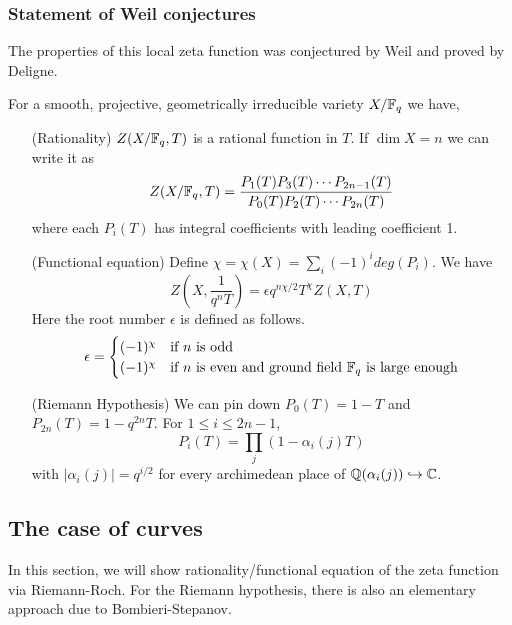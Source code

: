 \documentclass[letterpaper,11pt]{article}
\begin{document}
\subsubsection{Statement of Weil conjectures}
The properties of this local zeta function was conjectured by Weil and proved by Deligne.
\begin{thm}[Deligne]
For a smooth, projective, geometrically irreducible variety $X/\mathbb{F}_q$ we have,
\begin{itemize}
    \item[(Rationality)] $Z(X/\mathbb{F}_q, T)$ is a rational function in $T$. If $\dim X = n$ we can write it as 
    \[
    Z(X/\mathbb{F}_q,T) = \frac{P_1(T)P_3(T)\cdots P_{2n-1}(T)}{P_0(T)P_2(T) \cdots P_{2n}(T)}
    \]
    where each $P_i(T)$ has integral coefficients with leading coefficient 1.
    \item[(Functional equation)] Define $\chi = \chi(X) = \sum_i (-1)^i deg(P_i)$. We have
    \[
    Z\left(X, \frac{1}{q^n T}\right) = \epsilon q^{n \chi /2} T^{\chi} Z(X,T)
    \]
    Here the root number $\epsilon$ is defined as follows.
    \[
    \epsilon = \begin{cases}(-1)^{\chi} & \text{if $n$ is odd} \\ (-1)^{\chi} & \text{if $n$ is even and ground field $\mathbb{F}_q$ is large enough}\end{cases}
    \]
    \item[(Riemann Hypothesis)] We can pin down $P_0(T) = 1-T$ and $P_{2n}(T) = 1-q^{2n}T$. For $1 \leq i \leq 2n-1$, 
    \[
    P_i(T) = \prod_j (1 - \alpha_i(j) T)
    \]
    with $|\alpha_i(j)| = q^{i/2}$ for every archimedean place of $\mathbb{Q}(\alpha_i(j)) \hookrightarrow \mathbb{C}$.
\end{itemize}
\end{thm}
\subsection{The case of curves}
In this section, we will show rationality/functional equation of the zeta function via Riemann-Roch. For the Riemann hypothesis, there is also an elementary approach due to Bombieri-Stepanov.
\end{document}
